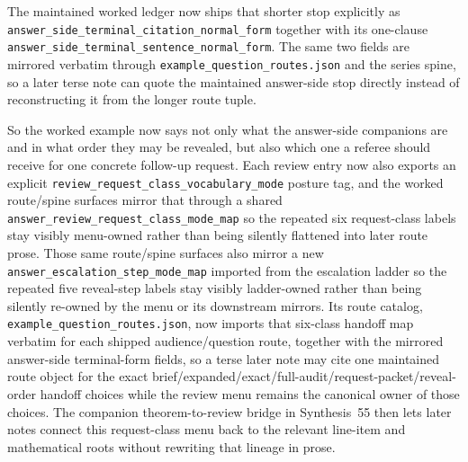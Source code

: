 \documentclass[11pt]{article}
\begin{document}
The maintained worked ledger now ships that shorter stop explicitly as \nolinkurl{answer_side_terminal_citation_normal_form} together with its one-clause \nolinkurl{answer_side_terminal_sentence_normal_form}. The same two fields are mirrored verbatim through \nolinkurl{example_question_routes.json} and the series spine, so a later terse note can quote the maintained answer-side stop directly instead of reconstructing it from the longer route tuple.

So the worked example now says not only what the answer-side companions are and in what order they may be revealed, but also which one a referee should receive for one concrete follow-up request. Each review entry now also exports an explicit \nolinkurl{review_request_class_vocabulary_mode} posture tag, and the worked route/spine surfaces mirror that through a shared \nolinkurl{answer_review_request_class_mode_map} so the repeated six request-class labels stay visibly menu-owned rather than being silently flattened into later route prose. Those same route/spine surfaces also mirror a new \nolinkurl{answer_escalation_step_mode_map} imported from the escalation ladder so the repeated five reveal-step labels stay visibly ladder-owned rather than being silently re-owned by the menu or its downstream mirrors. Its route catalog, \nolinkurl{example_question_routes.json}, now imports that six-class handoff map verbatim for each shipped audience/question route, together with the mirrored answer-side terminal-form fields, so a terse later note may cite one maintained route object for the exact brief/expanded/exact/full-audit/request-packet/reveal-order handoff choices while the review menu remains the canonical owner of those choices. The companion theorem-to-review bridge in Synthesis~55 then lets later notes connect this request-class menu back to the relevant line-item and mathematical roots without rewriting that lineage in prose.\cite{series:seriesspines}
\end{document}

